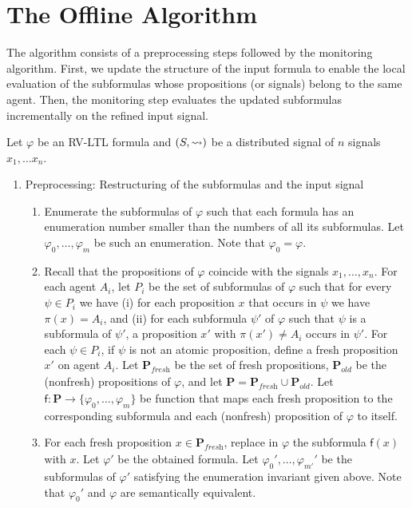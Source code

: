 \section{The Offline Algorithm}
The algorithm consists of a preprocessing steps followed by the monitoring algorithm.
First, we update the structure of the input formula to enable the local evaluation of the subformulas whose propositions (or signals) belong to the same agent.
Then, the monitoring step evaluates the updated subformulas incrementally on the refined input signal.

Let $\varphi$ be an RV-LTL formula and $(S,{\rightsquigarrow})$ be a distributed signal of $n$ signals $x_1, \ldots x_n$.

\begin{enumerate}
	\item Preprocessing: Restructuring of the subformulas and the input signal
	\begin{enumerate}[label=\arabic*.]
		\item
		Enumerate the subformulas of $\varphi$ such that each formula has an enumeration number smaller than the numbers of all its subformulas.
		Let $\varphi_0, \ldots, \varphi_m$ be such an enumeration.
		Note that $\varphi_0 = \varphi$.
		
		\item
		Recall that the propositions of $\varphi$ coincide with the signals $x_1, \ldots, x_n$.
		For each agent $A_i$, let $P_i$ be the set of subformulas of $\varphi$ such that for every $\psi \in P_i$ we have
		(i) for each proposition $x$ that occurs in $\psi$ we have $\pi(x) = A_i$, and
		(ii) for each subformula $\psi'$ of $\varphi$ such that $\psi$ is a subformula of $\psi'$, a proposition $x'$ with $\pi(x') \neq A_i$ occurs in $\psi'$.
		For each $\psi \in P_i$, if $\psi$ is not an atomic proposition, define a fresh proposition $x'$ on agent $A_i$.
		Let $\mathbf{P}_\textit{fresh}$ be the set of fresh propositions, $\mathbf{P}_\textit{old}$ be the (nonfresh) propositions of $\varphi$, and let $\mathbf{P} = \mathbf{P}_\textit{fresh} \cup \mathbf{P}_\textit{old}$.
		Let $\mathsf{f} : \mathbf{P} \to \{\varphi_0, \ldots, \varphi_m\}$ be function that maps each fresh proposition to the corresponding subformula and each (nonfresh) proposition of $\varphi$ to itself.
		
		\item
		For each fresh proposition $x \in \mathbf{P}_\textit{fresh}$, replace in $\varphi$ the subformula $\mathsf{f}(x)$ with $x$.
		Let $\varphi'$ be the obtained formula.
		Let $\varphi_0', \ldots, \varphi_{m'}'$ be the subformulas of $\varphi'$ satisfying the enumeration invariant given above.
		Note that $\varphi_0'$  and $\varphi$ are semantically equivalent. %
		

\end{enumerate}
\end{enumerate}
